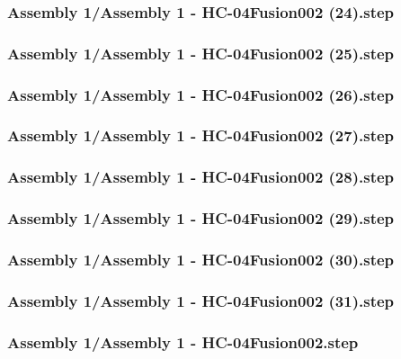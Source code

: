 \documentclass[a4paper,12pt]{article}
\begin{document}
\begin{lstlising}[language=C++]
\subsubsection{Assembly 1/Assembly 1 - HC-04Fusion002 (24).step}

\subsubsection{Assembly 1/Assembly 1 - HC-04Fusion002 (25).step}

\subsubsection{Assembly 1/Assembly 1 - HC-04Fusion002 (26).step}

\subsubsection{Assembly 1/Assembly 1 - HC-04Fusion002 (27).step}

\subsubsection{Assembly 1/Assembly 1 - HC-04Fusion002 (28).step}

\subsubsection{Assembly 1/Assembly 1 - HC-04Fusion002 (29).step}

\subsubsection{Assembly 1/Assembly 1 - HC-04Fusion002 (30).step}

\subsubsection{Assembly 1/Assembly 1 - HC-04Fusion002 (31).step}

\subsubsection{Assembly 1/Assembly 1 - HC-04Fusion002.step}


\end{lstlising}
\end{document}
